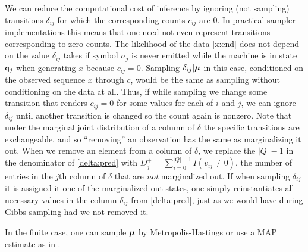 We can reduce the computational cost of inference by ignoring (not sampling) transitions $\delta_{ij}$ for which the corresponding counts $c_{ij}$ are 0.  In practical sampler implementations this means that one need not even represent transitions corresponding to zero counts.  The likelihood of the data \eqref{x:end} does not depend on the value $\delta_{ij}$ takes if symbol $\sigma_j$ is never emitted while the machine is in state $\q_j$ when generating $x$ because $c_{ij} = 0$.   Sampling $\delta_{ij} | \bmu$ in this case, conditioned on the observed sequence $x$ through $c$, would be the same as sampling without conditioning on the data at all.  Thus, if while sampling we change some transition that renders $c_{ij}=0$ for some values for each of $i$ and $j$, we can ignore $\delta_{ij}$ until another transition is changed so the count again is nonzero.  Note that under the marginal joint distribution of a column of $\delta$ the specific transitions are exchangeable, and so ``removing'' an observation has the same as marginalizing it out.  
When we remove an element from a column of $\delta$, we replace the $|Q| - 1$ in the denominator of \eqref{delta:pred} with $D^+_j = \sum_{i=0}^{|Q|-1}I(v_{ij}\neq0)$, the number of entries in the $j$th column of $\delta$ that are {\em not} marginalized out.
If when sampling $\delta_{ij}$ it is assigned it one of the marginalized out states, one simply reinstantiates all necessary values in the column  $\delta_{ij}$ from \eqref{delta:pred}, just as we would have during Gibbs sampling had we not removed it.  
 



In the finite case, one can sample $\bmu$ by Metropolis-Hastings or use a MAP estimate as in \cite{Mackay1995}.  
 
